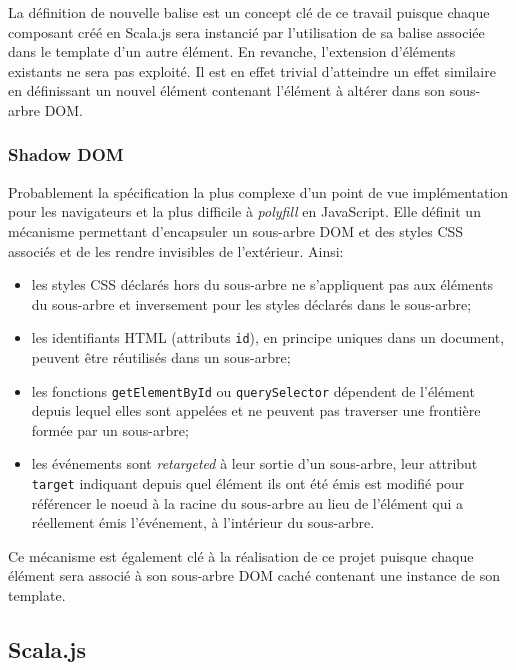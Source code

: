 La définition de nouvelle balise est un concept clé de ce travail puisque chaque composant créé en Scala.js sera instancié par l'utilisation de sa balise associée dans le template d'un autre élément. En revanche, l'extension d'éléments existants ne sera pas exploité. Il est en effet trivial d'atteindre un effet similaire en définissant un nouvel élément contenant l'élément à altérer dans son sous-arbre DOM.

\subsubsection{Shadow DOM}

Probablement la spécification la plus complexe d'un point de vue implémentation pour les navigateurs et la plus difficile à \emph{polyfill} en JavaScript. Elle définit un mécanisme permettant d'encapsuler un sous-arbre DOM et des styles CSS associés et de les rendre invisibles de l'extérieur. Ainsi:

\begin{itemize}
	\item les styles CSS déclarés hors du sous-arbre ne s'appliquent pas aux éléments du sous-arbre et inversement pour les styles déclarés dans le sous-arbre;
	
	\item les identifiants HTML (attributs \texttt{id}), en principe uniques dans un document, peuvent être réutilisés dans un sous-arbre;
	
	\item les fonctions \texttt{getElementById} ou \texttt{querySelector} dépendent de l'élément depuis lequel elles sont appelées et ne peuvent pas traverser une frontière formée par un sous-arbre;
	
	\item les événements sont \emph{retargeted} à leur sortie d'un sous-arbre, leur attribut \texttt{target} indiquant depuis quel élément ils ont été émis est modifié pour référencer le noeud à la racine du sous-arbre au lieu de l'élément qui a réellement émis l'événement, à l'intérieur du sous-arbre.
\end{itemize}

Ce mécanisme est également clé à la réalisation de ce projet puisque chaque élément sera associé à son sous-arbre DOM caché contenant une instance de son template.

\subsection{Scala.js}

